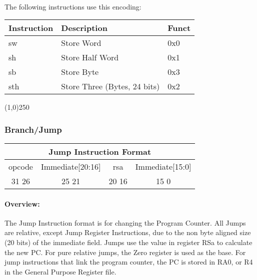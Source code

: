 \documentclass[letterpaper, 11pt]{article}
\begin{document}
\paragraph{}The following instructions use this encoding: \\
\begin{center}
	\begin{tabular}{|l|l|l|} \hline
			Instruction & Description 						& Funct\\ \hline
			sw			& Store Word							& 0x0 \\ \hline
			sh			& Store Half Word					& 0x1 \\ \hline
			sb			& Store Byte							& 0x3 \\ \hline
			sth			& Store Three (Bytes, 24 bits)		& 0x2 \\ \hline

\end{tabular}
\end{center}
\begin{center}
	\line(1,0){250}
\end{center}

\subsubsection{Branch/Jump}

\begin{center}
		\begin{tabular}{|c|c|c|c|}
				\multicolumn{4}{c}{Jump Instruction Format}\\ \hline
				\hspace{2pt} opcode \hspace{2pt}  & \hspace{3pt} Immediate[20:16] \hspace{3pt} &  \hspace{4pt} rsa \hspace{4pt} & \hspace{10pt} Immediate[15:0]  \hspace{10pt}   \\	\hline
							31 \hfill 26& 25  \hfill 21 &20 \hfill  16& 15 \hfill   0\\ \hline
		
	\end{tabular}
\end{center}	
\paragraph{Overview:} The Jump Instruction format is for changing the Program Counter. 
All Jumps are relative, except Jump Register Instructions,
due to the non byte aligned size (20 bits) of the immediate field. Jumps use the value in register RSa to calculate
the new PC. For pure relative jumps, the Zero register is used as the base. For jump instructions that link the program counter, 
the PC is stored in RA0, or R4 in the General Purpose Register file.
\end{document}
